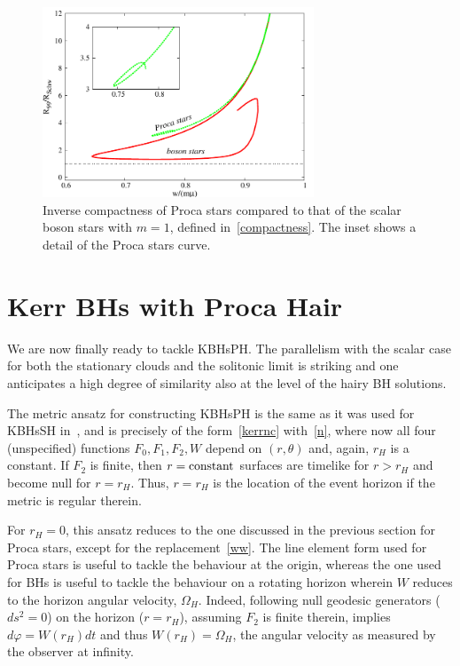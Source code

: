 \begin{figure}[h!]
  \begin{center}
    \includegraphics[width=8.1cm]{papers/Proca/w-Comp-Schw.pdf}  
         \end{center}
 \caption{Inverse compactness of Proca stars compared to that of the scalar boson stars with $m=1$, defined in~\eqref{compactness}. The inset shows a detail of the Proca stars curve.}
  \label{compactnessfig}
\end{figure}




\section{Kerr BHs with Proca Hair} 
\label{sec_kbhsph}
We are now finally ready to tackle KBHsPH. The parallelism with the scalar case for both the stationary clouds and the solitonic limit is striking and one anticipates a high degree of similarity also at the level of the hairy BH solutions. 

The metric ansatz for constructing KBHsPH is the same as it was used for KBHsSH in~\cite{Herdeiro:2014goa}, and is precisely of the form~\eqref{kerrnc} with~\eqref{n}, where now 
all four (unspecified) functions $F_0,F_1,F_2,W$ depend on $(r,\theta)$ and, again, $r_H$ is a constant. If $F_2$ is finite, then $r={\rm constant}$ surfaces are timelike for $r>r_H$ and become null for $r=r_H$. Thus, $r=r_H$ is the location of the event horizon if the metric is regular therein.

For $r_H=0$, this ansatz reduces to the one discussed in the previous section for Proca stars, except for the replacement~\eqref{ww}. The line element form used for Proca stars is useful to tackle the behaviour at the origin, whereas the one used for BHs is useful to tackle the behaviour on a rotating horizon wherein $W$ reduces to the horizon angular velocity, $\Omega_H$. Indeed, following null geodesic generators ($ds^2=0$) on the horizon ($r=r_H$), assuming $F_2$ is finite therein, implies $d\varphi=W(r_H)dt$ and thus $W(r_H)=\Omega_H$, the angular velocity as measured by the observer at infinity.

